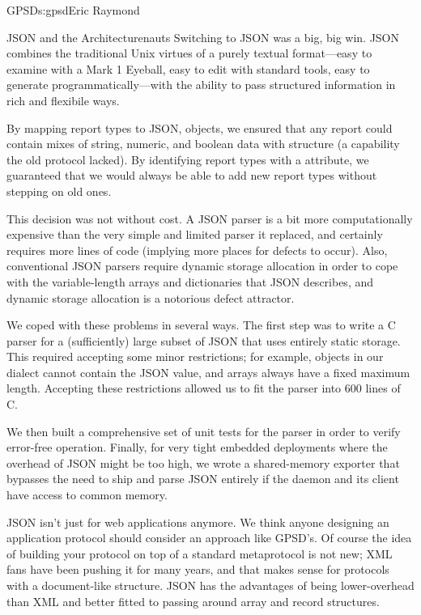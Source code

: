 \begin{aosachapter}{GPSD}{s:gpsd}{Eric Raymond}
\begin{aosasect1}{JSON and the Architecturenauts}
Switching to JSON was a big, big win. JSON combines the traditional
Unix virtues of a purely textual format---easy to examine with a Mark
1 Eyeball, easy to edit with standard tools, easy to generate
programmatically---with the ability to pass structured information in
rich and flexibile ways.

By mapping report types to JSON, objects, we ensured that any report
could contain mixes of string, numeric, and boolean data with
structure (a capability the old protocol lacked).  By identifying
report types with a  attribute, we guaranteed that we
would always be able to add new report types without stepping on old
ones.

This decision was not without cost.  A JSON parser is a bit more
computationally expensive than the very simple and limited parser it
replaced, and certainly requires more lines of code (implying more
places for defects to occur). Also, conventional JSON parsers require
dynamic storage allocation in order to cope with the variable-length
arrays and dictionaries that JSON describes, and dynamic storage
allocation is a notorious defect attractor.

We coped with these problems in several ways. The first step was to
write a C parser for a (sufficiently) large subset of JSON that uses
entirely static storage.  This required accepting some minor
restrictions; for example, objects in our dialect cannot contain the
JSON  value, and arrays always have a fixed maximum length.
Accepting these restrictions allowed us to fit the parser into 600
lines of C.

We then built a comprehensive set of unit tests for the parser 
in order to verify error-free operation. Finally, for very tight
embedded deployments where the overhead of JSON might be too high,
we wrote a shared-memory exporter that bypasses the need to
ship and parse JSON entirely if the daemon and its client have
access to common memory.

JSON isn't just for web applications anymore.  We think anyone
designing an application protocol should consider an approach like
GPSD's.  Of course the idea of building your protocol on top of a
standard metaprotocol is not new; XML fans have been pushing it for
many years, and that makes sense for protocols with a document-like
structure. JSON has the advantages of being lower-overhead than XML
and better fitted to passing around array and record structures.

\end{aosasect1}


\end{aosachapter}
